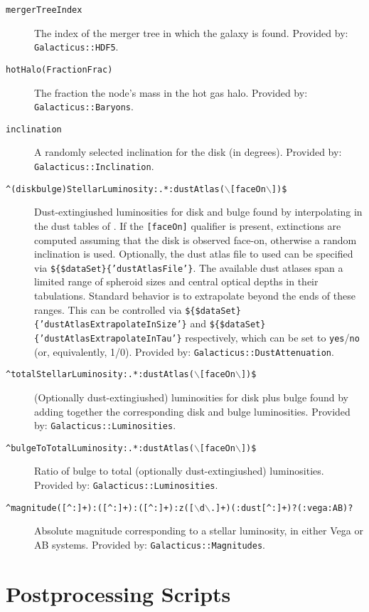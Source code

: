 \begin{description}
 \item[{\tt mergerTreeIndex}] The index of the merger tree in which the galaxy is found. Provided by: {\tt Galacticus::HDF5}.
 \item[{\tt hotHalo(Fraction\textbar Frac)}] The fraction the node's mass in the hot gas halo. Provided by: {\tt Galacticus::Baryons}.
 \item[{\tt inclination}] A randomly selected inclination for the disk (in degrees). Provided by: {\tt Galacticus::Inclination}.
 \item[{\tt \textasciicircum(disk\textbar bulge)StellarLuminosity:.*:dustAtlas($\backslash$[faceOn$\backslash$])\$}] Dust-extingiushed luminosities for disk and bulge found by interpolating in the dust tables of \cite{ferrara_atlas_1999}. If the {\tt [faceOn]} qualifier is present, extinctions are computed assuming that the disk is observed face-on, otherwise a random inclination is used. Optionally, the dust atlas file to used can be specified via {\tt \$\{\$dataSet\}\{'dustAtlasFile'\}}. The available dust atlases span a limited range of spheroid sizes and central optical depths in their tabulations. Standard behavior is to extrapolate beyond the ends of these ranges. This can be controlled via {\tt \$\{\$dataSet\}\{'dustAtlasExtrapolateInSize'\}} and {\tt \$\{\$dataSet\}\{'dustAtlasExtrapolateInTau'\}} respectively, which can be set to {\tt yes}/{\tt no} (or, equivalently, 1/0). Provided by: {\tt Galacticus::DustAttenuation}.
 \item[{\tt \textasciicircum totalStellarLuminosity:.*:dustAtlas($\backslash$[faceOn$\backslash$])\$}] (Optionally dust-extingiushed) luminosities for disk plus bulge found by adding together the corresponding disk and bulge luminosities. Provided by: {\tt Galacticus::Luminosities}.
 \item[{\tt \textasciicircum bulgeToTotalLuminosity:.*:dustAtlas($\backslash$[faceOn$\backslash$])\$}] Ratio of bulge to total (optionally dust-extingiushed) luminosities. Provided by: {\tt Galacticus::Luminosities}.
 \item[{\tt \textasciicircum magnitude([\textasciicircum :]+):([\textasciicircum :]+):([\textasciicircum :]+):z([$\backslash$d$\backslash$.]+)(:dust[\textasciicircum :]+)?(:vega\textbar :AB)?}] Absolute magnitude corresponding to a stellar luminosity, in either Vega or AB systems. Provided by: {\tt Galacticus::Magnitudes}.
\end{description}

\section{Postprocessing Scripts}\label{sec:PostProcessingScripts}

